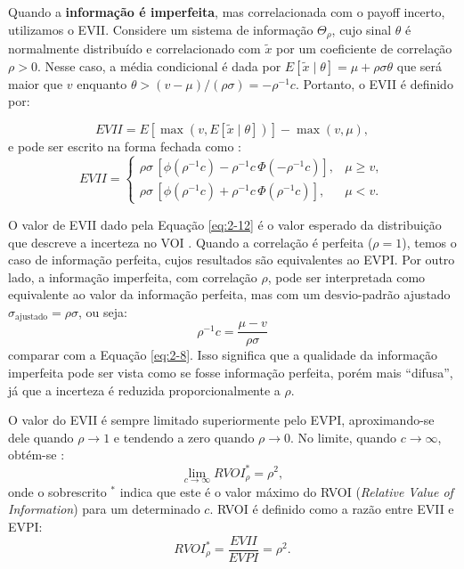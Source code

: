 Quando a \textbf{informação é imperfeita}, mas correlacionada com o payoff incerto, utilizamos o EVII. Considere um sistema de informação $\Theta_{\rho}$, cujo sinal $\theta$ é normalmente distribuído e correlacionado com $\tilde{x}$ por um coeficiente de correlação $\rho > 0$. 
Nesse caso, a média condicional é dada por $E[\tilde{x} \mid \theta] = \mu + \rho \sigma \theta$ que será maior que $v$ enquanto $\theta > (v - \mu)/(\rho \sigma)=-\rho^{-1}c$. Portanto, o EVII é definido por:

\begin{equation}
EVII = E[\max(v, E[\tilde{x} \mid \theta])] - \max(v, \mu),
\label{eq:2-11}
\end{equation}
e pode ser escrito na forma fechada como \cite{04}:
\begin{equation}
EVII =
\begin{cases}
\rho \sigma \, [\phi(\rho^{-1}c) - \rho^{-1}c \, \Phi(-\rho^{-1}c)], & \mu \geq v, \\[6pt]
\rho \sigma \, [\phi(\rho^{-1}c) + \rho^{-1}c \, \Phi(\rho^{-1}c)], & \mu < v.
\end{cases}
\label{eq:2-12}
\end{equation}

O valor de EVII dado pela Equação \eqref{eq:2-12} é o valor esperado da distribuição que descreve a incerteza no VOI \cite{15}. Quando a correlação é perfeita ($\rho=1$), temos o caso de informação perfeita, cujos resultados são equivalentes ao EVPI. Por outro lado, a informação imperfeita, com correlação $\rho$, pode ser interpretada como equivalente ao valor da informação perfeita, mas com um desvio-padrão ajustado $\sigma_{\text{ajustado}} = \rho \sigma$, ou seja:
\begin{equation}
    \rho^{-1}c = \frac{\mu - v}{\rho \sigma}
    \label{eq:2-13}
\end{equation}
comparar com a Equação \eqref{eq:2-8}. Isso significa que a qualidade da informação imperfeita pode ser vista como se fosse informação perfeita, porém mais ``difusa'', já que a incerteza é reduzida proporcionalmente a $\rho$.

O valor do EVII é sempre limitado superiormente pelo EVPI, aproximando-se dele quando $\rho \to 1$ e tendendo a zero quando $\rho \to 0$. No limite, quando $c \to \infty$, obtém-se \cite{04}:
\begin{equation}
\lim_{c \to \infty} RVOI^{*}_{\rho} = \rho^2,
\label{eq:2-14}
\end{equation}
onde o sobrescrito $^{*}$ indica que este é o valor máximo do RVOI (\textit{Relative Value of Information}) para um determinado $c$. RVOI é definido como a razão entre EVII e EVPI:
\begin{equation}
RVOI_{\rho}^{*} = \frac{EVII}{EVPI} = \rho^2.
\label{eq:2-15}
\end{equation}

